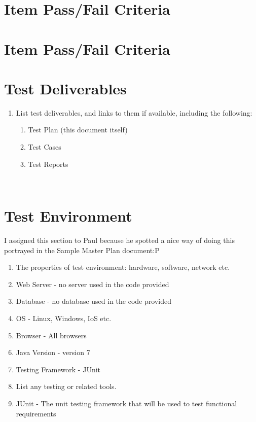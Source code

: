 \section{Item Pass/Fail Criteria}


\section{Item Pass/Fail Criteria}


\section{Test Deliverables}

\begin{enumerate}
	\item List test deliverables, and links to them if available, including the following:

\begin{enumerate}
	\item Test Plan (this document itself)
	\item Test Cases 
	\item Test Reports
\end{enumerate}
\end{enumerate}
~
\section{Test Environment}

I assigned this section to Paul because he spotted a nice way of doing this portrayed in the Sample Master Plan document:P

\begin{enumerate}
	\item The properties of test environment: hardware, software, network etc.
	\item Web Server - no server used in the code provided
	\item Database - no database used in the code provided
	\item OS - Linux, Windows, IoS etc.
	\item Browser - All browsers
	\item Java Version - version 7
	\item Testing Framework - JUnit
	\item List any testing or related tools.
	\item JUnit - The unit testing framework that will be used to test functional requirements
\end{enumerate}

